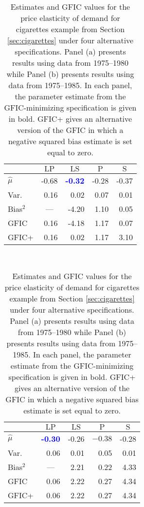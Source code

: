 \begin{table}[htbp]
    \begin{subtable}[h]{0.45\textwidth}
        \centering
 \caption{1975--1980 ($T=6$)}
 \label{tab:cigaretteShort}
      \begin{tabular}{lrrrr}\hline\hline
          & \multicolumn{1}{c}{$\text{LP}$} & \multicolumn{1}{c}{$\text{LS}$} 
          & \multicolumn{1}{c}{$\text{P}$} & \multicolumn{1}{c}{$\text{S}$}\\
          \hline
          $\widehat{\mu}$ & -0.68 & \textcolor{blue}{\textbf{-0.32}} &  -0.28 &  -0.37\\
        Var.\ &0.16 & 0.02 & 0.07 & 0.01\\ 
        Bias$^2$ & \multicolumn{1}{c}{---} & -4.20 & 1.10 & 0.05\\
        GFIC &0.16 & -4.18 & 1.17 & 0.07\\
        GFIC+ &0.16 & 0.02 & 1.17 & 3.10\\
        \hline
      \end{tabular}
    \end{subtable}
    ~
    \begin{subtable}[h]{0.45\textwidth}
      \centering
      \caption{1975--1985 ($T=11$)}
      \label{tab:cigaretteLong}
      \begin{tabular}{lrrrr}\hline\hline 
          & \multicolumn{1}{c}{$\text{LP}$} & \multicolumn{1}{c}{$\text{LS}$} 
          & \multicolumn{1}{c}{$\text{P}$} & \multicolumn{1}{c}{$\text{S}$}\\
        \hline
        $\widehat{\mu}$ & \textcolor{blue}{\textbf{-0.30}} & -0.26 &  $-0.38$ &  -0.28\\
        Var.\ & 0.06 & 0.01 & 0.05 & 0.01\\ 
        Bias$^2$ & \multicolumn{1}{c}{---} & 2.21 & 0.22 & 4.33\\
        GFIC  &0.06 & 2.22 & 0.27 &  4.34\\
        GFIC+  & 0.06 & 2.22 & 0.27 &  4.34\\
        \hline
      \end{tabular}
    \end{subtable}
    \caption{Estimates and GFIC values for the price elasticity of demand for cigarettes example from Section \ref{sec:cigarettes} under four alternative specifications. Panel (a) presents results using data from 1975--1980 while Panel (b) presents results using data from 1975--1985. In each panel, the parameter estimate from the GFIC-minimizing specification is given in bold. GFIC+ gives an alternative version of the GFIC in which a negative squared bias estimate is set equal to zero.}
\end{table}


